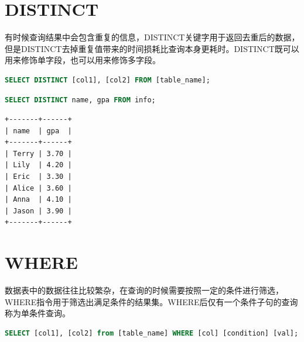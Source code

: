 \documentclass[12pt, openany, oneside]{book}
\begin{document}
\vspace{0.5cm}

\section{DISTINCT}

有时候查询结果中会包含重复的信息，DISTINCT关键字用于返回去重后的数据，但是DISTINCT去掉重复值带来的时间损耗比查询本身更耗时。DISTINCT既可以用来修饰单字段，也可以用来修饰多字段。

\vspace{-0.5cm}

\begin{lstlisting}[language=SQL]
SELECT DISTINCT [col1], [col2] FROM [table_name];
\end{lstlisting}

\vspace{0.5cm}


\begin{lstlisting}[language=SQL]
SELECT DISTINCT name, gpa FROM info;
\end{lstlisting}

\begin{tcolorbox}
	\begin{verbatim}
+-------+------+
| name  | gpa  |
+-------+------+
| Terry | 3.70 |
| Lily  | 4.20 |
| Eric  | 3.30 |
| Alice | 3.60 |
| Anna  | 4.10 |
| Jason | 3.90 |
+-------+------+
\end{verbatim}
\end{tcolorbox}

\vspace{0.5cm}

\section{WHERE}

数据表中的数据往往比较繁杂，在查询的时候需要按照一定的条件进行筛选，WHERE指令用于筛选出满足条件的结果集。WHERE后仅有一个条件子句的查询称为单条件查询。

\vspace{-0.5cm}

\begin{lstlisting}[language=SQL]
SELECT [col1], [col2] from [table_name] WHERE [col] [condition] [val];
\end{lstlisting}
\end{document}
